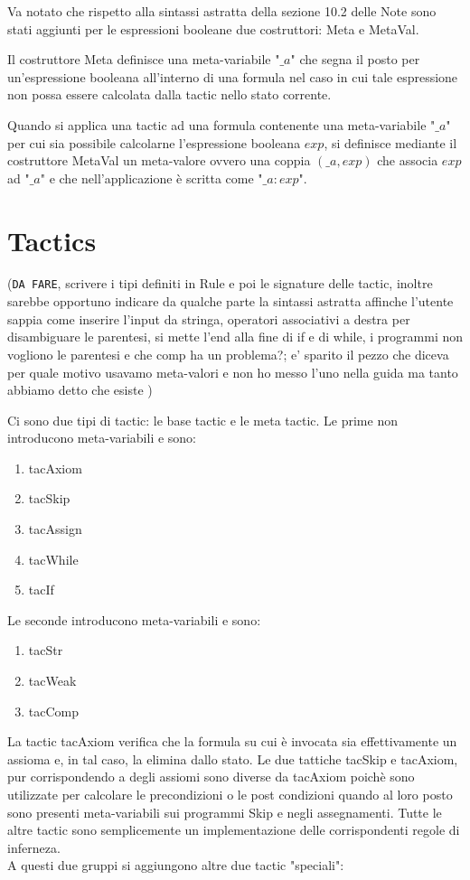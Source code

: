 \documentclass[]{article}
\begin{document}
Va notato che rispetto alla sintassi astratta della sezione 10.2 delle Note sono stati aggiunti per le espressioni booleane due costruttori: Meta e MetaVal.

Il costruttore Meta definisce una meta-variabile "$\_a$" che segna il posto per un'espressione booleana all'interno di  una formula nel caso in cui tale espressione non possa essere calcolata dalla tactic nello stato corrente.

Quando si applica una tactic ad una formula contenente una meta-variabile "$\_a$" per cui sia possibile calcolarne l'espressione booleana $exp$, si definisce mediante il costruttore MetaVal un meta-valore ovvero una coppia $(\_a, exp)$ che associa $exp$ ad "$\_a$" e che nell'applicazione \`e scritta come "$\_a : exp$".

\section{Tactics}

(\texttt{DA FARE}, scrivere i tipi definiti in Rule e poi le signature delle tactic, inoltre sarebbe opportuno indicare da qualche parte la sintassi astratta affinche l'utente sappia come inserire l'input da stringa, operatori associativi a destra per disambiguare le parentesi, si mette l'end alla fine di if e di while, i programmi non vogliono le parentesi e che comp ha un problema?; e' sparito il pezzo che diceva per quale motivo usavamo meta-valori e non ho messo l'uno nella guida ma tanto abbiamo detto che esiste )

Ci sono due tipi di tactic: le base tactic e le meta tactic. Le prime non introducono meta-variabili e sono:
\begin{enumerate}
	\item tacAxiom
	\item tacSkip
	\item tacAssign
	\item tacWhile
	\item tacIf
	\setcounter{enumTemp}{\theenumi}
\end{enumerate}
Le seconde introducono meta-variabili e sono:
\begin{enumerate}
	\setcounter{enumi}{\theenumTemp}
	\item tacStr
	\item tacWeak
	\item tacComp
	\setcounter{enumTemp}{\theenumi}
\end{enumerate}
La tactic tacAxiom verifica che la formula su cui \`e invocata sia effettivamente un assioma e, in tal caso, la elimina dallo stato. Le due tattiche tacSkip e tacAxiom, pur corrispondendo a degli assiomi sono diverse da tacAxiom poich\`e sono utilizzate per calcolare le precondizioni o le post condizioni quando al loro posto sono presenti meta-variabili sui programmi Skip e negli assegnamenti. Tutte le altre tactic sono semplicemente un implementazione delle corrispondenti regole di inferneza.\\
A questi due gruppi si aggiungono altre due tactic "speciali":
\end{document}
